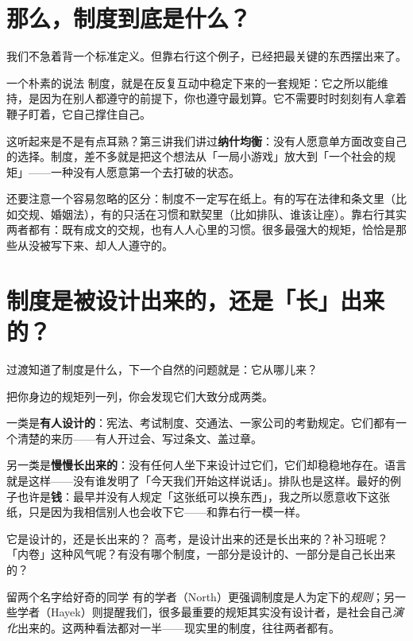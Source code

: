 \documentclass[10pt,a4paper]{ctexart}
\newcommand{\transitionnote}[1]{%
  \begin{conceptbox}{过渡}#1\end{conceptbox}%
}
\begin{document}
\section{那么，制度到底是什么？}

我们不急着背一个标准定义。但靠右行这个例子，已经把最关键的东西摆出来了。

\begin{conceptbox}{一个朴素的说法}
制度，就是在反复互动中稳定下来的一套规矩：它之所以能维持，是因为在别人都遵守的前提下，你也遵守最划算。它不需要时时刻刻有人拿着鞭子盯着，它自己撑住自己。
\end{conceptbox}

这听起来是不是有点耳熟？第三讲我们讲过\textbf{纳什均衡}：没有人愿意单方面改变自己的选择。制度，差不多就是把这个想法从「一局小游戏」放大到「一个社会的规矩」——一种没有人愿意第一个去打破的状态。

还要注意一个容易忽略的区分：制度不一定写在纸上。有的写在法律和条文里（比如交规、婚姻法），有的只活在习惯和默契里（比如排队、谁该让座）。靠右行其实两者都有：既有成文的交规，也有人人心里的习惯。很多最强大的规矩，恰恰是那些从没被写下来、却人人遵守的。

\section{制度是被设计出来的，还是「长」出来的？}

\transitionnote{知道了制度是什么，下一个自然的问题就是：它从哪儿来？}

把你身边的规矩列一列，你会发现它们大致分成两类。

一类是\textbf{有人设计的}：宪法、考试制度、交通法、一家公司的考勤规定。它们都有一个清楚的来历——有人开过会、写过条文、盖过章。

另一类是\textbf{慢慢长出来的}：没有任何人坐下来设计过它们，它们却稳稳地存在。语言就是这样——没有谁发明了「今天我们开始这样说话」。排队也是这样。最好的例子也许是\textbf{钱}：最早并没有人规定「这张纸可以换东西」，我之所以愿意收下这张纸，只是因为我相信别人也会收下它——和靠右行一模一样。

\begin{discussionbox}{它是设计的，还是长出来的？}
高考，是设计出来的还是长出来的？补习班呢？「内卷」这种风气呢？有没有哪个制度，一部分是设计的、一部分是自己长出来的？
\end{discussionbox}

\begin{notebox}{留两个名字给好奇的同学}
有的学者（North）更强调制度是人为定下的\emph{规则}；另一些学者（Hayek）则提醒我们，很多最重要的规矩其实没有设计者，是社会自己\emph{演化}出来的。这两种看法都对一半——现实里的制度，往往两者都有。
\end{notebox}
\end{document}
